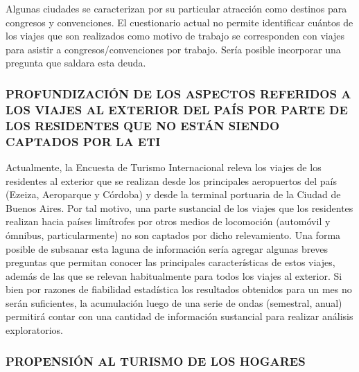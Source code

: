 \documentclass[
  openany]{book}
\begin{document}
Algunas ciudades se caracterizan por su particular atracción como destinos para congresos y convenciones.
El cuestionario actual no permite identificar cuántos de los viajes que son realizados como motivo de trabajo se corresponden con viajes para asistir a congresos/convenciones por trabajo.
Sería posible incorporar una pregunta que saldara esta deuda.

\hypertarget{profundizaciuxf3n-de-los-aspectos-referidos-a-los-viajes-al-exterior-del-pauxeds-por-parte-de-los-residentes-que-no-estuxe1n-siendo-captados-por-la-eti}{%
\subsubsection{\texorpdfstring{\textbf{PROFUNDIZACIÓN DE LOS ASPECTOS REFERIDOS A LOS VIAJES AL EXTERIOR DEL PAÍS POR PARTE DE LOS RESIDENTES QUE NO ESTÁN SIENDO CAPTADOS POR LA ETI}}{PROFUNDIZACIÓN DE LOS ASPECTOS REFERIDOS A LOS VIAJES AL EXTERIOR DEL PAÍS POR PARTE DE LOS RESIDENTES QUE NO ESTÁN SIENDO CAPTADOS POR LA ETI}}\label{profundizaciuxf3n-de-los-aspectos-referidos-a-los-viajes-al-exterior-del-pauxeds-por-parte-de-los-residentes-que-no-estuxe1n-siendo-captados-por-la-eti}}

Actualmente, la Encuesta de Turismo Internacional releva los viajes de los residentes al exterior que se realizan desde los principales aeropuertos del país (Ezeiza, Aeroparque y Córdoba) y desde la terminal portuaria de la Ciudad de Buenos Aires.
Por tal motivo, una parte sustancial de los viajes que los residentes realizan hacia países limítrofes por otros medios de locomoción (automóvil y ómnibus, particularmente) no son captados por dicho relevamiento.
Una forma posible de subsanar esta laguna de información sería agregar algunas breves preguntas que permitan conocer las principales características de estos viajes, además de las que se relevan habitualmente para todos los viajes al exterior.
Si bien por razones de fiabilidad estadística los resultados obtenidos para un mes no serán suficientes, la acumulación luego de una serie de ondas (semestral, anual) permitirá contar con una cantidad de información sustancial para realizar análisis exploratorios.

\hypertarget{propensiuxf3n-al-turismo-de-los-hogares}{%
\subsubsection{\texorpdfstring{\textbf{PROPENSIÓN AL TURISMO DE LOS HOGARES}}{PROPENSIÓN AL TURISMO DE LOS HOGARES}}\label{propensiuxf3n-al-turismo-de-los-hogares}}
\end{document}
